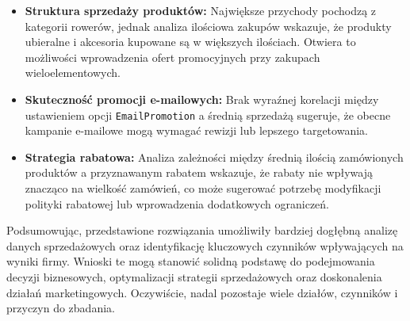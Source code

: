 \documentclass[a4paper,12pt]{article}
\begin{document}
\begin{enumerate}
\begin{itemize}
              \item \textbf{Struktura sprzedaży produktów:}
                    Największe przychody pochodzą z kategorii rowerów, jednak analiza ilościowa zakupów wskazuje, że produkty ubieralne i akcesoria kupowane są w większych ilościach. Otwiera to możliwości wprowadzenia ofert promocyjnych przy zakupach wieloelementowych.

              \item \textbf{Skuteczność promocji e-mailowych:}
                    Brak wyraźnej korelacji między ustawieniem opcji \texttt{EmailPromotion} a średnią sprzedażą sugeruje, że obecne kampanie e-mailowe mogą wymagać rewizji lub lepszego targetowania.

              \item \textbf{Strategia rabatowa:}
                    Analiza zależności między średnią ilością zamówionych produktów a przyznawanym rabatem wskazuje, że rabaty nie wpływają znacząco na wielkość zamówień, co może sugerować potrzebę modyfikacji polityki rabatowej lub wprowadzenia dodatkowych ograniczeń.
          \end{itemize}
\end{enumerate}

Podsumowując, przedstawione rozwiązania umożliwiły bardziej dogłębną analizę danych sprzedażowych oraz identyfikację kluczowych czynników wpływających na wyniki firmy. Wnioski te mogą stanowić solidną podstawę do podejmowania decyzji biznesowych, optymalizacji strategii sprzedażowych oraz doskonalenia działań marketingowych. Oczywiście, nadal pozostaje wiele działów, czynników i przyczyn do zbadania.

\printbibliography
\end{document}
